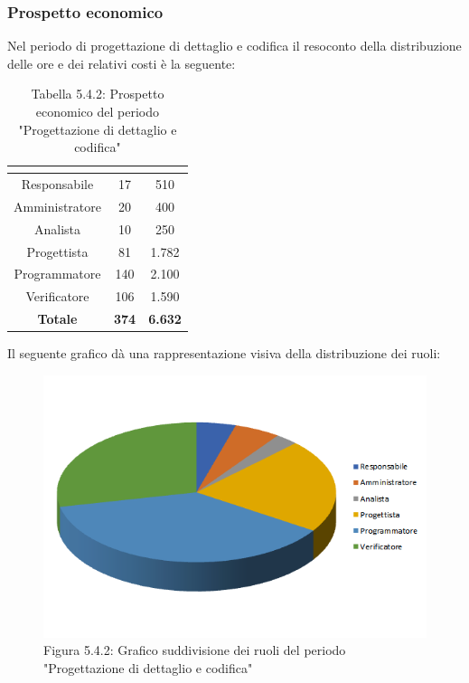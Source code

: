 \subsubsection{Prospetto economico}
Nel periodo di progettazione di dettaglio e codifica il resoconto della distribuzione delle ore e dei relativi costi è la seguente:

\renewcommand{\arraystretch}{1.5}
\begin{table}[H]
\begin{center}
\begin{tabular}{|c|c|c|}
\hline
\rowcolor{title_row}
\textbf{\color{title_text}{Ruolo}}  & \textbf{\color{title_text}{Ore}} & \textbf{\color{title_text}{Costo in \euro}} \\ \hline
Responsabile    & 17           & 510                 \\ \hline
Amministratore  & 20           & 400                 \\ \hline
Analista        & 10           & 250  	               \\ \hline
Progettista     & 81           & 1.782                \\ \hline
Programmatore   & 140          & 2.100                \\ \hline
Verificatore    & 106          & 1.590                \\ \hline
\textbf{Totale} & \textbf{374}    & \textbf{6.632}           \\ \hline
\end{tabular}
\caption{Tabella 5.4.2: Prospetto economico del periodo "Progettazione di dettaglio e codifica"\label{}}
\end{center}
\end{table}
\renewcommand{\arraystretch}{1}

Il seguente grafico dà una rappresentazione visiva della distribuzione dei ruoli: \\
\begin{figure} [H]
	\centering
	\includegraphics[scale=1]{Res/ExcelGrafici/Grafici/CodificaRuoli.png}
	\caption{Figura 5.4.2: Grafico suddivisione dei ruoli del periodo "Progettazione di dettaglio e codifica"}\label{}
\end{figure}

\pagebreak
